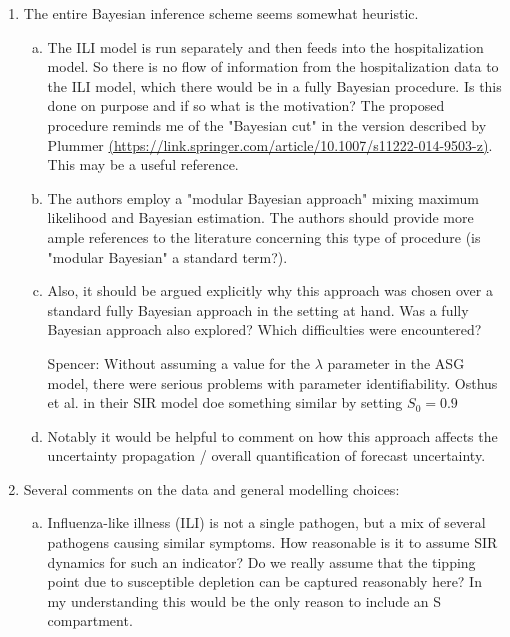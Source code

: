 \documentclass{article}
\newcommand{\spencer}[1]{{\color{green} Spencer: #1}}
\begin{document}
\begin{enumerate}[1.]
\item The entire Bayesian inference scheme seems somewhat heuristic.

\begin{enumerate}[a.]
\item The ILI model is run separately and then feeds into the hospitalization model. So there is no
flow of information from the hospitalization data to the ILI model, which there would be in a fully
Bayesian procedure. Is this done on purpose and if so what is the motivation? The proposed
procedure reminds me of the "Bayesian cut" in the version described by Plummer
\href{(https://link.springer.com/article/10.1007/s11222-014-9503-z)}{(https://link.springer.com/article/10.1007/s11222-014-9503-z)}.
This may be a useful reference.
\item The authors employ a "modular Bayesian approach" mixing maximum likelihood and
Bayesian estimation. The authors should provide more ample references to the literature concerning
this type of procedure (is "modular Bayesian" a standard term?).
\item Also, it should be argued explicitly why this approach was chosen over a standard fully
Bayesian approach in the setting at hand. Was a fully Bayesian approach also explored? Which
difficulties were encountered?

\spencer{Without assuming a value for the $\lambda$ parameter in the ASG model, there were
serious problems with parameter identifiability. 
Osthus et al. in their SIR model doe something similar by setting $S_0 = 0.9$}

\item Notably it would be helpful to comment on how this approach affects the uncertainty
propagation / overall quantification of forecast uncertainty.

\end{enumerate}


\item Several comments on the data and general modelling choices:

\begin{enumerate}[a.]
\item Influenza-like illness (ILI) is not a single pathogen, but a mix of several pathogens causing
similar symptoms. How reasonable is it to assume SIR dynamics for such an indicator? Do we
really assume that the tipping point due to susceptible depletion can be captured reasonably here? In
my understanding this would be the only reason to include an S compartment.


\end{enumerate}
\end{enumerate}
\end{document}
